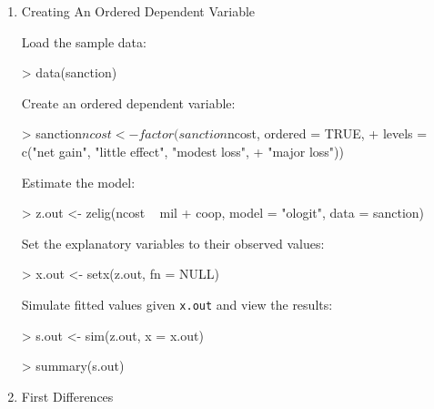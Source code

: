 \begin{enumerate}

\item {Creating An Ordered Dependent Variable} \label{ord.fact}

Load the sample data:  
\begin{Schunk}
\begin{Sinput}
> data(sanction)
\end{Sinput}
\end{Schunk}
Create an ordered dependent variable: 
\begin{Schunk}
\begin{Sinput}
> sanction$ncost <- factor(sanction$ncost, ordered = TRUE, 
+     levels = c("net gain", "little effect", "modest loss", 
+         "major loss"))
\end{Sinput}
\end{Schunk}
Estimate the model:
\begin{Schunk}
\begin{Sinput}
> z.out <- zelig(ncost ~ mil + coop, model = "ologit", data = sanction)
\end{Sinput}
\end{Schunk}
Set the explanatory variables to their observed values:  
\begin{Schunk}
\begin{Sinput}
> x.out <- setx(z.out, fn = NULL)
\end{Sinput}
\end{Schunk}
Simulate fitted values given {\tt x.out} and view the results:
\begin{Schunk}
\begin{Sinput}
> s.out <- sim(z.out, x = x.out)
\end{Sinput}
\end{Schunk}
\begin{Schunk}
\begin{Sinput}
> summary(s.out)
\end{Sinput}
\end{Schunk}

\item {First Differences}


\end{enumerate}
